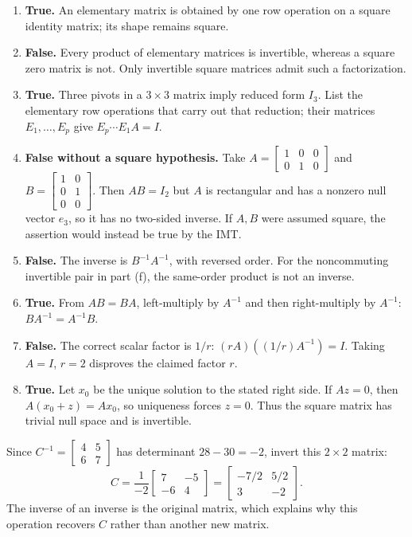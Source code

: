 \begin{enumerate}[label=(\alph*)]
matrix for the corresponding row replacement with the indices exchanged.
\item \textbf{True.} An elementary matrix is obtained by one row
operation on a square identity matrix; its shape remains square.
\item \textbf{False.} Every product of elementary matrices is invertible,
whereas a square zero matrix is not. Only invertible square matrices admit
such a factorization.
\item \textbf{True.} Three pivots in a $3\times3$ matrix imply reduced
form $I_3$. List the elementary row operations that carry out that reduction;
their matrices $E_1,\ldots,E_p$ give $E_p\cdots E_1A=I$.
\item \textbf{False without a square hypothesis.} Take
$A=\begin{bmatrix}1&0&0\\0&1&0\end{bmatrix}$ and
$B=\begin{bmatrix}1&0\\0&1\\0&0\end{bmatrix}$.
Then $AB=I_2$ but $A$ is rectangular and has a nonzero null vector $e_3$,
so it has no two-sided inverse. If $A,B$ were assumed square, the assertion
would instead be true by the IMT.
\item \textbf{False.} The inverse is $B^{-1}A^{-1}$, with reversed order.
For the noncommuting invertible pair in part (f), the same-order product
is not an inverse.
\item \textbf{True.} From $AB=BA$, left-multiply by $A^{-1}$ and then
right-multiply by $A^{-1}$: $BA^{-1}=A^{-1}B$.
\item \textbf{False.} The correct scalar factor is $1/r$:
$(rA)((1/r)A^{-1})=I$. Taking $A=I$, $r=2$ disproves the claimed factor $r$.
\item \textbf{True.} Let $x_0$ be the unique solution to the stated
right side. If $Az=0$, then $A(x_0+z)=Ax_0$, so uniqueness forces
$z=0$. Thus the square matrix has trivial null space and is invertible.
\end{enumerate}

Since $C^{-1}=\begin{bmatrix}4&5\\6&7\end{bmatrix}$ has determinant
$28-30=-2$, invert this $2\times2$ matrix:
\[
 \boxed{C=\frac1{-2}\begin{bmatrix}7&-5\\-6&4\end{bmatrix}
 =\begin{bmatrix}-7/2&5/2\\3&-2\end{bmatrix}}.
\]
The inverse of an inverse is the original matrix, which explains why this
operation recovers $C$ rather than another new matrix.

